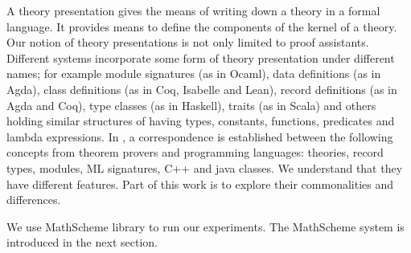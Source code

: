 A theory presentation gives the means of writing down a theory in a formal language. It provides 
means to define the components of the kernel of a theory. Our notion of theory presentations is not 
only limited to proof assistants. Different systems incorporate some form of theory presentation under 
different names; for example module signatures (as in Ocaml), data definitions (as in Agda), class 
definitions (as in Coq, Isabelle and Lean), record definitions (as in Agda and Coq), type classes (as in 
Haskell), traits (as in Scala) and others holding similar structures of having types, constants, 
functions, predicates and lambda expressions. In \cite{MFK2018TheoriesAsTypes}, a correspondence is 
established between the following concepts from theorem provers and programming languages: 
theories, record types, modules, ML signatures, C++ and java classes. We understand that they have 
different features. Part of this work is to explore their commonalities and differences. 

We use MathScheme library to run our experiments. The MathScheme system is introduced in the next 
section. 



